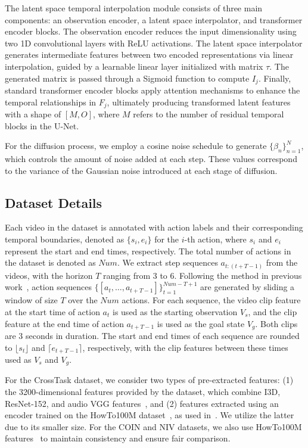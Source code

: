 The latent space temporal interpolation module consists of three main components: an observation encoder, a latent space interpolator, and transformer encoder blocks. The observation encoder reduces the input dimensionality using two 1D convolutional layers with ReLU activations. The latent space interpolator generates intermediate features between two encoded representations via linear interpolation, guided by a learnable linear layer initialized with matrix $\tau$. The generated matrix is passed through a Sigmoid function to compute $I_j$. Finally, standard transformer encoder blocks apply attention mechanisms to enhance the temporal relationships in $F_j$, ultimately producing transformed latent features with a shape of $[M, O]$, where $M$ refers to the number of residual temporal blocks in the U-Net.


For the diffusion process, we employ a cosine noise schedule to generate $\{\beta_n\}_{n=1}^N$, which controls the amount of noise added at each step. These values correspond to the variance of the Gaussian noise introduced at each stage of diffusion.


\subsection{Dataset Details} 
Each video in the dataset is annotated with action labels and their corresponding temporal boundaries, denoted as $\{s_i, e_i\}$ for the $i$-th action, where $s_i$ and $e_i$ represent the start and end times, respectively. The total number of actions in the dataset is denoted as $Num$. We extract step sequences $a_{t:(t+T-1)}$ from the videos, with the horizon $T$ ranging from 3 to 6. Following the method in previous work~\citep{wang2023pdpp}, action sequences $\{[a_t, \ldots, a_{t+T-1}]\}_{t=1}^{Num-T+1}$ are generated by sliding a window of size $T$ over the $Num$ actions. For each sequence, the video clip feature at the start time of action $a_t$ is used as the starting observation $V_s$, and the clip feature at the end time of action $a_{t+T-1}$ is used as the goal state $V_g$. Both clips are 3 seconds in duration. The start and end times of each sequence are rounded to $\lfloor s_t \rfloor$ and $\lceil e_{t+T-1} \rceil$, respectively, with the clip features between these times used as $V_s$ and $V_g$.

For the CrossTask dataset, we consider two types of pre-extracted features: (1) the 3200-dimensional features provided by the dataset, which combine I3D, ResNet-152, and audio VGG features~\citep{carreira2017quo,he2016deep,hershey2017cnn}, and (2) features extracted using an encoder trained on the HowTo100M dataset~\citep{miech2019howto100m}, as used in~\citep{wang2023pdpp}. We utilize the latter due to its smaller size. For the COIN and NIV datasets, we also use HowTo100M features~\citep{wang2023pdpp} to maintain consistency and ensure fair comparison.



